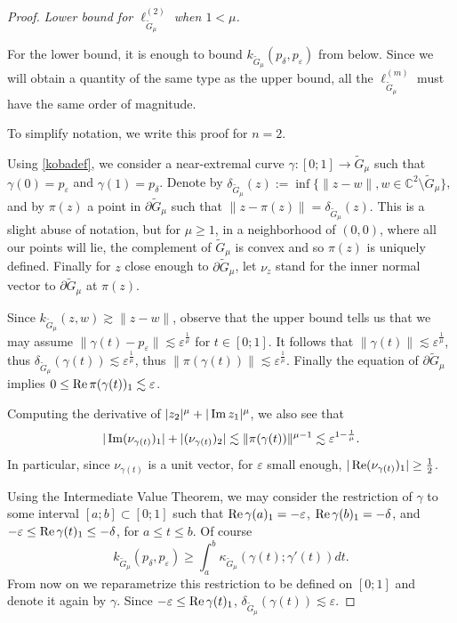 \documentclass[a4paper,12pt]{amsart}
\def\C{\mathbb C}
\renewcommand{\Im}{\operatorname{\rm{Im}}}
\renewcommand{\Re}{\operatorname{\rm{Re}}}
\newcommand{\eps}{\varepsilon}
\begin{document}
\begin{proof}
\smallskip

{\it Lower bound for $\ell_{\tilde G_\mu}^{(2)}$ when $1< \mu $.}

For the lower bound, %
it is enough
to bound $k_{\tilde G_\mu}(p_\delta, p_\eps)$ from below.  Since we will obtain a quantity of 
the same type as the upper bound, all the $\ell^{(m)}_{\tilde G_\mu}$ must have the same order of magnitude.

To simplify notation, we write this proof for $n=2$.

Using \eqref{kobadef}, we consider a near-extremal curve
$\gamma:[0;1]\longrightarrow \tilde G_\mu$ such that $\gamma(0)=p_\eps$
and $\gamma(1)=p_\delta$.  Denote by $\delta_{\tilde G_\mu}(z):=
\inf\{\|z-w\|, w\in \C^2\setminus \tilde G_\mu\}$, and by $\pi(z)$
a point in $\partial \tilde G_\mu$ such that $\|z-\pi(z)\|=\delta_{\tilde G_\mu}(z)$.
This is a slight abuse of notation, but for $\mu\ge 1$,
 in a neighborhood
of $(0,0)$, where all our points will lie, the complement
of $\tilde G_\mu$ is convex and so $\pi(z)$ is uniquely defined.
Finally for $z$ close enough to $\partial \tilde G_\mu$,
let $\nu_z$ stand for the inner normal vector to $\partial \tilde G_\mu$
at $\pi(z)$.

Since
$k_{\tilde G_\mu}(z,w)\gtrsim \|z-w\| $, observe that the upper bound tells
us that we may assume $\|\gamma(t)-p_\eps\| \lesssim \eps^{\frac1\mu}$
for $t \in [0;1]$. It follows that $\|\gamma(t)\| \lesssim \eps^{\frac1\mu}$,
thus $\delta_{\tilde G_\mu}(\gamma(t))\lesssim \eps^{\frac1\mu}$,
thus $\|\pi(\gamma(t))\|\lesssim \eps^{\frac1\mu}$. Finally
the equation of $\partial \tilde G_\mu$ implies $0\le \Re \pi(\gamma(t))_1
\lesssim \eps$.

Computing the derivative of $|z_2|^\mu + |\Im z_1|^\mu$, we also see
that
\begin{equation}
\label{nu2}
|\Im(\nu_{\gamma(t)})_1| + |(\nu_{\gamma(t)})_2| \lesssim \|\pi(\gamma(t))\|^{\mu-1}
\lesssim  \eps^{1-\frac1\mu}.
\end{equation}
In particular, since
$\nu_{\gamma(t)}$ is a unit vector, for $\eps$ small
enough, $|\Re (\nu_{\gamma(t)})_1|\ge \frac{1}{2}$.


Using the Intermediate Value Theorem,
 we may consider  the restriction of $\gamma$
to some interval $[a;b]\subset [0;1]$ such that
$\Re \gamma(a)_1 =-\eps$, $\Re \gamma(b)_1 =-\delta$,
and $-\eps\le \Re \gamma(t)_1 \le -\delta$, for $a\le t \le b$.
Of course
\[
k_{\tilde G_\mu}(p_\delta, p_\eps) \ge \int_a^b\kappa_{\tilde G_\mu}(\gamma(t);\gamma'(t))dt.
\]
From now on we reparametrize this restriction to be defined on $[0;1]$
and denote it again by $\gamma$.
Since $-\eps \le \Re \gamma(t)_1$, $\delta_{\tilde G_\mu}(\gamma(t))\lesssim \eps$.


\end{proof}
\end{document}
